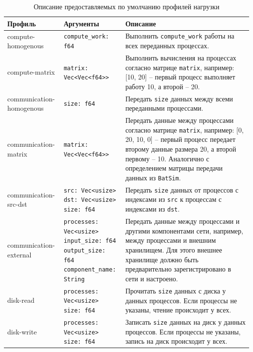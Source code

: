 \begin{table}[h!]
    \centering
    \begin{tabular}{|l|l|p{7cm}|}
        \hline
        \textbf{Профиль} & \textbf{Аргументы} & \textbf{Описание} \\ 
        \hline
        compute-homogenous & \texttt{compute\_work: f64} & Выполнить \texttt{compute\_work} работы на всех переданных процессах.\\
        \hline
        compute-matrix &  \texttt{matrix: Vec<Vec<f64>>} & Выполнить вычисления на процессах согласно матрице \texttt{matrix}, например: 
        [10, 20] -- первый процесс выполняет работу 10, а второй -- 20. \\
        \hline
        \makecell{
        communication-\\homogenous} & \texttt{size: f64} & Передать \texttt{size} данных между всеми переданными процессами. \\
        \hline 
        communication-matrix &  \texttt{matrix: Vec<Vec<f64>>}  & Передать данные между процессами согласно матрице \texttt{matrix}, например: 
        [0, 20,
        10, 0] -- первый процесс передает второму данные размера 20, а второй первому -- 10. Аналогично с определением матрицы передачи данных из \texttt{BatSim}\cite{batsim-profile-types-overview}. \\
        \hline
        communication-src-dst & \makecell[tl]{
              \texttt{src: Vec<usize>} \\ \texttt{dst: Vec<usize>} \\ \texttt{size: f64} }
         & Передать \texttt{size} данных от процессов с индексами из \texttt{src} к процессам с индексами из \texttt{dst}. \\
        \hline
        \makecell{communication-\\external} & \makecell[tl]{
             \texttt{processes: Vec<usize>}\\ \texttt{input\_size: f64}\\ \texttt{output\_size: f64}\\ \texttt{component\_name: String}} & Передать данные между процессами и другими компонентами сети, например, между процессами и внешним хранилищем. Для этого внешнее хранилище должно быть предварительно зарегистрировано в сети и настроено. \\
            \hline
        disk-read & \makecell[tl]{ \texttt{processes: Vec<usize>}\\ \texttt{size: f64}} & Прочитать \texttt{size} данных с диска у данных процессов. Если процессы не указаны, чтение происходит у всех. \\
        \hline
        disk-write & \makecell[tl]{\texttt{processes: Vec<usize>}\\\texttt{size: f64}}  & Записать \texttt{size} данных на диск у данных процессов. Если процессы не указаны, запись на диск происходит у всех. \\
        \hline
    \end{tabular}
    \caption{Описание предоставляемых по умолчанию профилей нагрузки}
    \label{tab:default-profiles}
\end{table}


